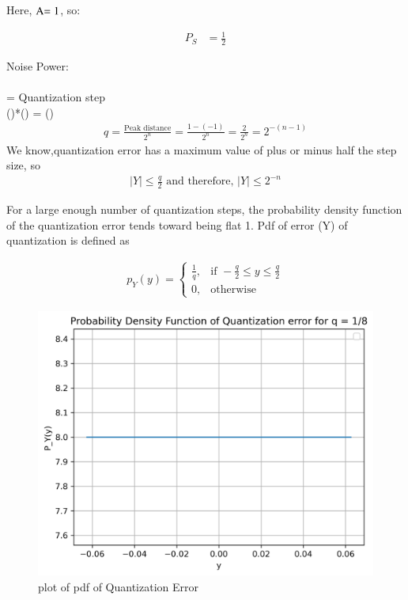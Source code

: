 \documentclass[journal,12pt,onecolumn]{IEEEtran}
\begin{document}
Here, \($A$ = 1\), so:

\begin{align}
P_S &= \frac{1}{2}
\end{align}
\item Noise Power:\\
\\
 = Quantization step \\
()*() =    ()\\
\begin{align}
q = \frac{\text{Peak distance}}{2^{n}} = \frac{1-(-1)}{2^{n}} = \frac{2}{2^{n}} = 2^{-(n-1)} \label{eq:gate:1}
\end{align}
\label{fig:Gate.31.2023.1}
We know,quantization error has a maximum value of plus or minus half the
step size, so 
\begin{align}
\left| Y \right| \leq \frac{q}{2} \text{ and therefore, } \left| Y \right| \leq 2^{-n}
\end{align}

For a large enough number of quantization steps, the probability density function of the quantization error tends toward being flat 1.
Pdf of error (Y) of quantization is defined as 

\begin{align}
p_Y(y) = 
\begin{cases}
    \frac{1}{q}, & \text{if } -\frac{q}{2} \leq y \leq \frac{q}{2} \\
    0, & \text{otherwise}
\end{cases}
\end{align}
\begin{figure}[H]
  \centering
  \includegraphics[width=0.7\columnwidth]{Graph/b.png}
  \caption{plot of pdf of Quantization Error}
  \label{2023/EC/31/Graph/b.png}
\end{figure}
\end{document}
